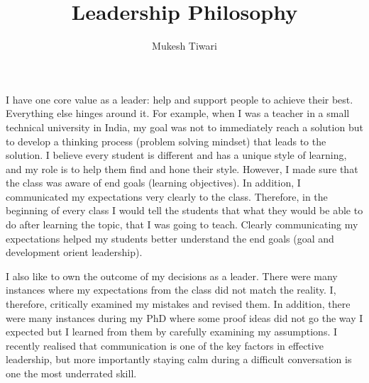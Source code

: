 \documentclass[a4paper]{article}
\title{Leadership Philosophy}
\author{Mukesh Tiwari}
\date{}
\begin{document}
\fontsize{12}{15}
\selectfont
\maketitle


I have one core value as a leader: help and support people to achieve their best. Everything 
else hinges around it. For example, when I was a teacher in a small technical university 
in India, my goal was not to immediately reach a solution but to develop a 
thinking process (problem solving mindset) that leads to the solution. I believe every 
student is different and has a unique style of learning, and my role is to help them find 
and hone their style. However, I made sure that the class was aware of 
end goals (learning objectives). In addition, I communicated my expectations very clearly
to the class. Therefore, 
in the beginning of every class I would tell the students that what they would be 
able to do after learning the topic, that I was going to teach. 
Clearly communicating my expectations helped my students better understand the end goals
(goal and development orient leadership).

I also like to own the outcome of my decisions as a leader. There were many instances where 
my expectations from the class did not match the reality. I, therefore,  
critically examined my mistakes and revised them. In addition, there were 
many instances during my PhD where some proof ideas did not go the 
way I expected but I learned from them by carefully examining my assumptions. I 
recently realised that communication is one of the key 
factors in effective leadership, but more importantly staying calm 
during a difficult conversation is one the most underrated skill.
\end{document}
